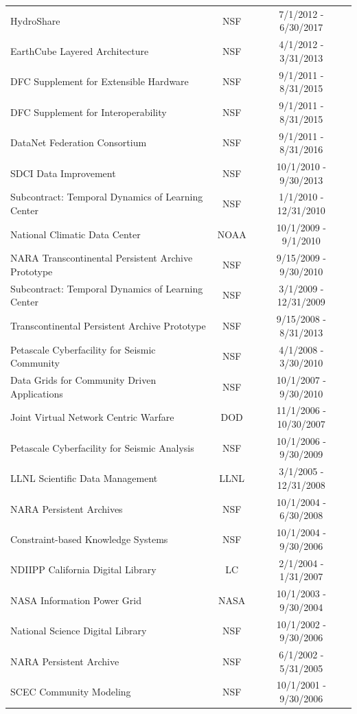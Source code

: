 \documentclass[10pt,oneside]{memoir}
\begin{document}
\begin{center}
\begin{tabular}{ |l|c|c| }
 \hline
 HydroShare & NSF & 7/1/2012 - 6/30/2017 \\
 EarthCube Layered Architecture & NSF & 4/1/2012 - 3/31/2013 \\
 DFC Supplement for Extensible Hardware & NSF & 9/1/2011 - 8/31/2015 \\
 DFC Supplement for Interoperability & NSF & 9/1/2011 - 8/31/2015 \\
 DataNet Federation Consortium & NSF & 9/1/2011 - 8/31/2016 \\
 SDCI Data Improvement & NSF & 10/1/2010 - 9/30/2013 \\
 Subcontract: Temporal Dynamics of Learning Center & NSF & 1/1/2010 - 12/31/2010 \\
 National Climatic Data Center & NOAA & 10/1/2009 - 9/1/2010 \\
 NARA Transcontinental Persistent Archive Prototype & NSF & 9/15/2009 - 9/30/2010 \\
 Subcontract: Temporal Dynamics of Learning Center & NSF & 3/1/2009 - 12/31/2009 \\
 Transcontinental Persistent Archive Prototype & NSF & 9/15/2008 - 8/31/2013 \\
 Petascale Cyberfacility for Seismic Community & NSF & 4/1/2008 - 3/30/2010 \\
 Data Grids for Community Driven Applications & NSF & 10/1/2007 - 9/30/2010 \\
 Joint Virtual Network Centric Warfare & DOD & 11/1/2006 - 10/30/2007 \\
 Petascale Cyberfacility for Seismic Analysis & NSF & 10/1/2006 - 9/30/2009 \\
 LLNL Scientific Data Management & LLNL & 3/1/2005 - 12/31/2008 \\
 NARA Persistent Archives & NSF & 10/1/2004 - 6/30/2008 \\
 Constraint-based Knowledge Systems & NSF & 10/1/2004 - 9/30/2006 \\
 NDIIPP California Digital Library & LC & 2/1/2004 - 1/31/2007 \\
 NASA Information Power Grid & NASA & 10/1/2003 - 9/30/2004 \\
 National Science Digital Library & NSF & 10/1/2002 - 9/30/2006 \\
 NARA Persistent Archive & NSF & 6/1/2002 - 5/31/2005 \\
 SCEC Community Modeling & NSF & 10/1/2001 - 9/30/2006 \\

\end{tabular}
\end{center}
\end{document}

